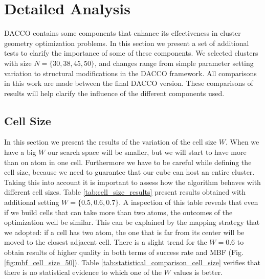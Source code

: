 		\pagebreak
		\section{Detailed Analysis}
		\label{sec:detailed_analysis}
		
		DACCO contains some components that enhance its effectiveness in cluster geometry optimization problems. In this section we present a set of additional tests to clarify the importance of some of these components. We selected clusters with size $N=\{30, 38, 45, 50\}$, and changes range from simple parameter setting variation to structural modifications in the DACCO framework. All comparisons in this work are made between the final DACCO version. These comparisons of results will help clarify the influence of the different components used.
		
		
		\subsection{Cell Size}
		In this section we present the results of the variation of the cell size $W$. When we have a big $W$ our search space will be smaller, but we will start to have more than on atom in one cell. Furthermore we have to be careful while defining the cell size, because we need to guarantee that our cube can host an entire cluster. Taking this into account it is important to assess how the algorithm behaves with different cell sizes.
		Table \ref{tab:cell_size_results} present results obtained with additional setting $W=\{0.5, 0.6, 0.7\}$. A inspection of this table reveals that even if we build cells that can take more than two atoms, the outcomes of the optimization well be similar. This can be explained by the mapping strategy that we adopted: if a cell has two atom, the one that is far from its center will be moved to the closest adjacent cell.
		There is a slight trend for the $W=0.6$ to obtain results of higher quality in both terms of success rate and MBF (Fig. \ref{fig:mbf_cell_size_50}).
		Table \ref{tab:statistical_comparison_cell_size} verifies that there is no statistical evidence to which one of the $W$ values is better.
		   		
